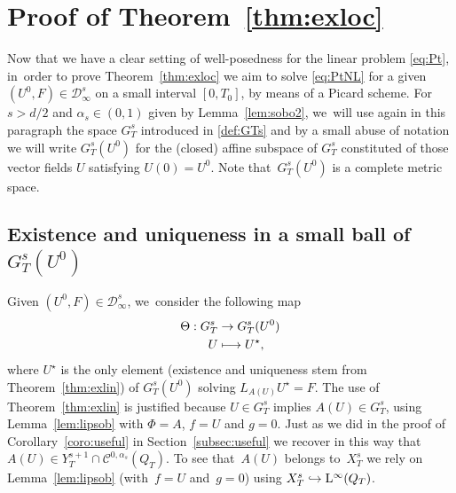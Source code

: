 \documentclass[10pt]{amsart}
\newcommand\mto{\mathchoice{\longmapsto}{\mapsto}{\mapsto}{\mapsto}}
\newcommand\hto{\mathrel{\lhook\joinrel\to}}
\theoremstyle{definition}
\renewcommand\L{\mathrm{L}}
\begin{document}
\section{Proof of Theorem~\ref{thm:exloc}}\label{sec:road}

Now that we have a clear setting of well-posedness for the linear problem \eqref{eq:Pt}, in~order to prove Theorem~\ref{thm:exloc} we aim to solve \eqref{eq:PtNL} for a given $(U^0,F)\in \mathcal D_\infty^s$ on a small interval $[0,T_0]$, by means of a Picard scheme. For $s>d/2$ and $\alpha_s\in(0,1)$ given by Lemma~\ref{lem:sobo2}, we~will use again in this paragraph the space $G_T^s$ introduced in \eqref{def:GTs} and by a small abuse of notation we will write $G_T^s(U^0)$ for the (closed) affine subspace of $G_T^s$ constituted of those vector fields $U$ satisfying $U(0)=U^0$. Note that~$G_T^s(U^0)$ is a complete metric space.

\subsection{Existence and uniqueness in a small ball of $G_T^s(U^0)$}\label{subsec:exunismall}
Given $(U^0,F)\in \mathcal D_\infty^s$, we~consider the following map\vspace*{-3pt}
\begin{align*}
\Theta: G_T^s &\to G_T^s(U^0) \\
U &\mto U^\star,
\end{align*}
where $U^\star$ is the only element (existence and uniqueness stem from Theorem~\ref{thm:exlin}) of $G_T^s(U^0)$ solving $L_{A(U)} U^\star = F$. The use of Theorem~\ref{thm:exlin} is justified because $U\in G_T^s$ implies $A(U)\in G_T^s$, using Lemma~\ref{lem:lipsob} with $\Phi=A$, $f=U$ and $g=0$. Just as we did in the proof of Corollary~\ref{coro:useful} in Section~\ref{subsec:useful} we recover in this way that $A(U)\in Y_T^{s+1} \cap \mathscr{C}^{0,\alpha_s}(Q_T)$. To see that~$A(U)$ belongs to~$ X_T^s$ we rely on Lemma~\ref{lem:lipsob} (with~$f = U$ and~$g = 0$) using $X_T^s\hto\L^\infty(Q_T)$.
\end{document}

